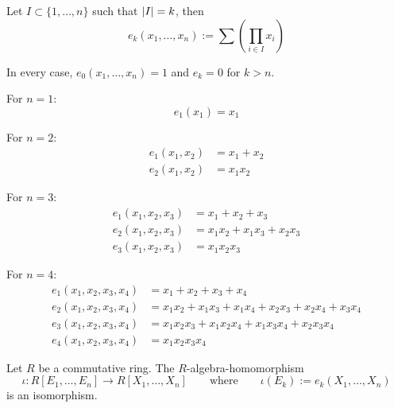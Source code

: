 \begin{definition}
   Let \(I \subset \{1, \ldots, n\}\) such that \(\left\lvert I\right\rvert = k\), then
   \[e_k(x_1, \ldots, x_n) := \sum\left(\prod_{i \in I} x_i\right)\]
\end{definition}
\begin{example}
   In every case, \(e_0(x_1, \ldots, x_n) = 1\) and \(e_k = 0\) for \(k > n\).

   For \(n = 1\):
   \[e_1(x_1) = x_1\]

   For \(n = 2\):
   \begin{equation*}
      \begin{split}
         e_1(x_1,x_2) &= x_1 + x_2\\
         e_2(x_1,x_2) &= x_1 x_2
      \end{split}
   \end{equation*}

   For \(n = 3\):
   \begin{equation*}
      \begin{split}
         e_1(x_1, x_2, x_3) &= x_1 + x_2 + x_3\\
         e_2(x_1, x_2, x_3) &= x_1x_2 + x_1x_3 + x_2x_3\\
         e_3(x_1, x_2, x_3) &= x_1x_2x_3
      \end{split}
   \end{equation*}

   For \(n = 4\):
   \begin{equation*}
      \begin{split}
         e_1(x_1, x_2, x_3, x_4) &= x_1 + x_2 + x_3 + x_4\\
         e_2(x_1, x_2, x_3, x_4) &= x_1x_2 + x_1x_3 + x_1x_4 + x_2x_3 + x_2x_4 + x_3x_4\\
         e_3(x_1, x_2, x_3, x_4) &= x_1x_2x_3 + x_1x_2x_4 + x_1x_3x_4 + x_2x_3x_4\\
         e_4(x_1, x_2, x_3, x_4) &= x_1x_2x_3x_4
      \end{split}
   \end{equation*}
\end{example}

\begin{proposition}
   Let \(R\) be a commutative ring.
   The \(R\)-algebra-homomorphism
   \[\iota: R[E_1, \ldots, E_n] \to R[X_1, \ldots, X_n] \qquad\text{where}\qquad \iota(E_k) := e_k(X_1, \ldots, X_n)\]
   is an isomorphism.
\end{proposition}

